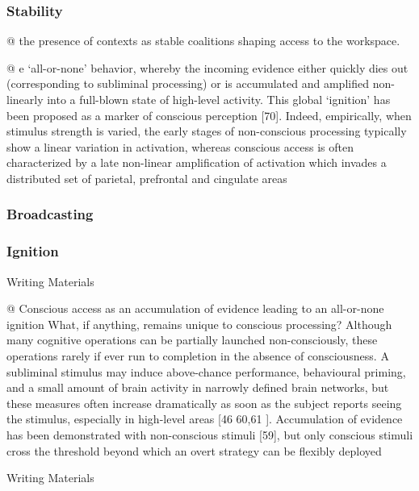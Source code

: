 \documentclass[utf8]{article}
\newenvironment{ants}
			{
			 \begin{easylist}[itemize]		
		 	}
			{
			\end{easylist}
			}
\newenvironment{writingMaterials}
			{	
			\begin{tcolorbox}[size=small, colframe=black!20!white, toprule=1mm]
				Writing Materials
			\end{tcolorbox}
			
			\begin{easylist}[itemize]		
			}
			{
			\end{easylist}
			\begin{tcolorbox}[size=small, bottomrule=1mm, halign=flush right, colframe=black!20!white]
				Writing Materials
			\end{tcolorbox}			
			}
\begin{document}
			\subsubsection{Stability}
				\begin{ants}
					@ the presence of contexts as stable coalitions shaping access to the workspace.
					
					@ e ‘all-or-none’ behavior, whereby the incoming evidence either quickly dies out (corresponding to subliminal processing) or is accumulated and ampliﬁed non-linearly into a full-blown state of high-level activity. This global ‘ignition’ has been proposed as a marker of conscious perception [70]. Indeed, empirically, when stimulus strength is varied, the early stages of non-conscious processing typically show a linear variation in activation, whereas conscious access is often characterized by a late non-linear ampliﬁcation of activation which invades a distributed set of parietal, prefrontal and cingulate areas
				\end{ants}
			
			
			\subsubsection{Broadcasting}
			
			
			
			
			\subsubsection{Ignition}
				\begin{writingMaterials}
					@ Conscious access as an accumulation of evidence leading to an all-or-none ignition What, if anything, remains unique to conscious processing? Although many cognitive operations can be partially launched non-consciously, these operations rarely if ever run to completion in the absence of consciousness. A subliminal stimulus may induce above-chance performance, behavioural priming, and a small amount of brain activity in narrowly deﬁned brain networks, but these measures often increase dramatically as soon as the subject reports seeing the stimulus, especially in high-level areas [46 60,61  ]. Accumulation of evidence has been demonstrated with non-conscious stimuli [59], but only conscious stimuli cross the threshold beyond which an overt strategy can be ﬂexibly deployed
				\end{writingMaterials}
				
				
				
\end{document}
